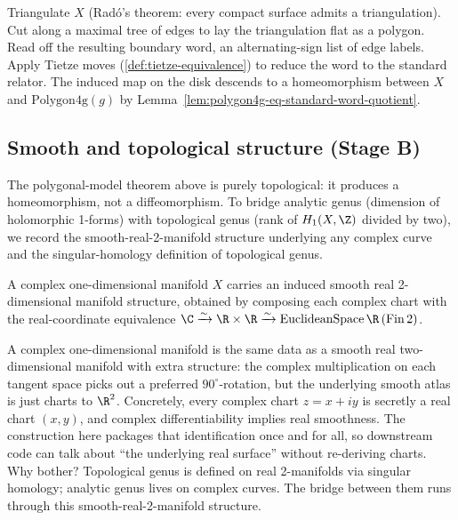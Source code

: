 \begin{proofsketch}
Triangulate \(X\) (Radó's theorem: every compact surface admits a
triangulation). Cut along a maximal tree of edges to lay the
triangulation flat as a polygon. Read off the resulting boundary
word, an alternating-sign list of edge labels. Apply Tietze moves
(\ref{def:tietze-equivalence}) to reduce the word to the standard
relator. The induced map on the disk descends to a homeomorphism
between \(X\) and \(\mathrm{Polygon4g}(g)\) by
Lemma~\ref{lem:polygon4g-eq-standard-word-quotient}.
\end{proofsketch}

\subsection{Smooth and topological structure (Stage B)}

The polygonal-model theorem above is purely topological: it produces
a homeomorphism, not a diffeomorphism. To bridge analytic genus
(dimension of holomorphic 1-forms) with topological genus (rank of
\(H_1(X,\Z)\) divided by two), we record the smooth-real-2-manifold
structure underlying any complex curve and the singular-homology
definition of topological genus.

\begin{definition}
\label{def:smooth-real-structure}
A complex one-dimensional manifold \(X\) carries an induced smooth
real 2-dimensional manifold structure, obtained by composing each
complex chart with the real-coordinate equivalence
\(\C \xrightarrow{\sim} \R\times\R \xrightarrow{\sim}
\mathrm{EuclideanSpace}\,\R\,(\mathrm{Fin}\,2)\).
\leanok
\end{definition}

\begin{layman}
A complex one-dimensional manifold is the same data as a smooth
real two-dimensional manifold with extra structure: the complex
multiplication on each tangent space picks out a preferred
\(90^{\circ}\)-rotation, but the underlying smooth atlas is just
charts to \(\R^2\). Concretely, every complex chart \(z=x+iy\) is
secretly a real chart \((x,y)\), and complex differentiability
implies real smoothness. The construction here packages that
identification once and for all, so downstream code can talk about
``the underlying real surface'' without re-deriving charts. Why
bother? Topological genus is defined on real 2-manifolds via
singular homology; analytic genus lives on complex curves. The
bridge between them runs through this smooth-real-2-manifold
structure.
\end{layman}

